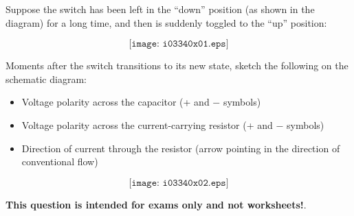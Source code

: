 

Suppose the switch has been left in the ``down'' position (as shown in the diagram) for a long time, and then is suddenly toggled to the ``up'' position:

$$\texttt{[image: i03340x01.eps]}$$

Moments after the switch transitions to its new state, sketch the following on the schematic diagram:

\begin{itemize}
\item{} Voltage polarity across the capacitor (+ and $-$ symbols)
\vskip 5pt
\item{} Voltage polarity across the current-carrying resistor (+ and $-$ symbols)
\vskip 5pt
\item{} Direction of current through the resistor (arrow pointing in the direction of conventional flow)
\end{itemize}







$$\texttt{[image: i03340x02.eps]}$$







{\bf This question is intended for exams only and not worksheets!}.


